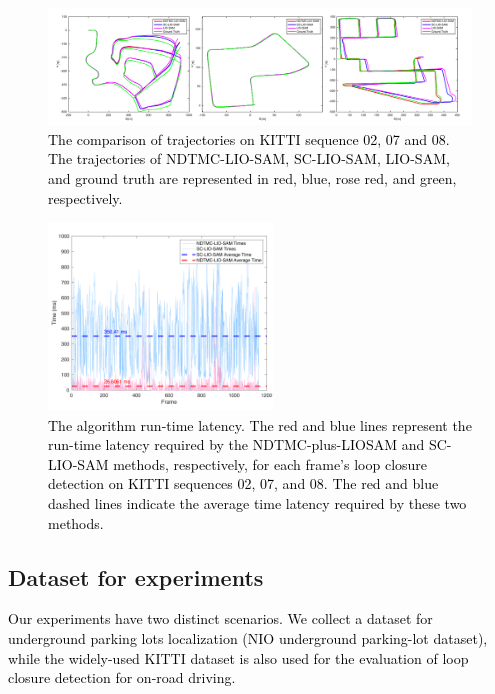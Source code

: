 \documentclass[letterpaper, 10 pt, conference]{ieeeconf}   %
\newcommand\kevin[1]{\textcolor{black}{#1}}
\begin{document}
\begin{figure}[t]
    \centering  %
    \includegraphics[width=\linewidth]{trajectorycompare.pdf} 
    \caption{\kevin{The comparison of trajectories on KITTI sequence 02, 07 and 08. The trajectories of NDTMC-LIO-SAM, SC-LIO-SAM, LIO-SAM, and ground truth are represented in red, blue, rose red, and green, respectively.}}
    \label{trajectorycompare}
    \vspace{-0.18in} %
\end{figure}

\begin{figure}[t]
    \centering  %
    \includegraphics[width=\linewidth,height=5cm]{timecompare.pdf} 
    \caption{\kevin{The algorithm run-time latency. The red and blue lines represent the run-time latency required by the NDTMC-plus-LIOSAM and SC-LIO-SAM methods, respectively, for each frame's loop closure detection on KITTI sequences 02, 07, and 08. The red and blue dashed lines indicate the average time latency required by these two methods.}}
    \label{timecompare}
    \vspace{-0.18in} %
\end{figure}



\subsection{Dataset for experiments}

\kevin{Our experiments have two distinct scenarios. We collect a dataset for underground parking lots localization (NIO underground parking-lot dataset), while the widely-used KITTI dataset\cite{KITTI} is also used for the evaluation of loop closure detection for on-road driving.}
\end{document}

